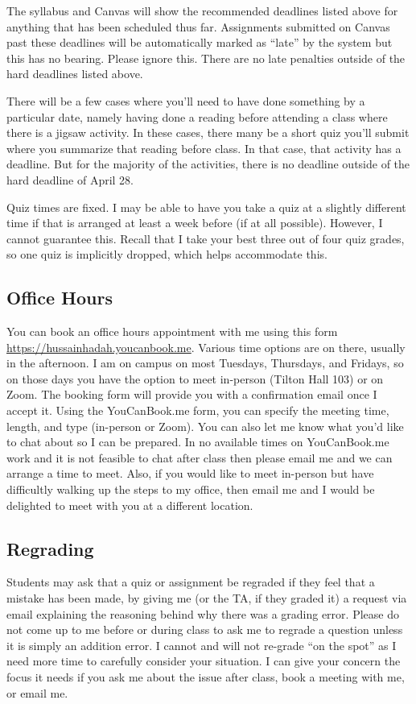\documentclass[11pt,letterpaper,final]{article}
\begin{document}
The syllabus and Canvas will show the recommended deadlines listed above for anything that has been scheduled thus far. Assignments submitted on Canvas past these deadlines will be automatically marked as ``late'' by the system but this has no bearing. Please ignore this. There are no late penalties outside of the hard deadlines listed above.

There will be a few cases where you'll need to have done something by a particular date, namely having done a reading before attending a class where there is a jigsaw activity. In these cases, there many be a short quiz you'll submit where you summarize that reading before class. In that case, that activity has a deadline. But for the majority of the activities, there is no deadline outside of the hard deadline of April 28.

Quiz times are fixed. I may be able to have you take a quiz at a slightly different time if that is arranged at least a week before (if at all possible). However, I cannot guarantee this. Recall that I take your best three out of four quiz grades, so one quiz is implicitly dropped, which helps accommodate this. 

\subsection{Office Hours}
You can book an office hours appointment with me using this form \url{https://hussainhadah.youcanbook.me}. Various time options are on there, usually in the afternoon. I am on campus on most Tuesdays, Thursdays, and Fridays, so on those days you have the option to meet in-person (Tilton Hall 103) or on Zoom.  The booking form will provide you with a confirmation email once I accept it. Using the YouCanBook.me form, you can specify the meeting time, length, and type (in-person or Zoom). You can also let me know what you'd like to chat about so I can be prepared. In no available times on YouCanBook.me work and it is not feasible to chat after class then please email me and we can arrange a time to meet. Also, if you would like to meet in-person but have difficultly walking up the steps to my office, then email me and I would be delighted to meet with you at a different location.
 
\subsection{Regrading}
Students may ask that a quiz or assignment be regraded if they feel that a mistake has been made, by giving me (or the TA, if they graded it) a request via email explaining the reasoning behind why there was a grading error. Please do not come up to me before or during class to ask me to regrade a question unless it is simply an addition error. I cannot and will not re-grade ``on the spot'' as I need more time to carefully consider your situation. I can give your concern the focus it needs if you ask me about the issue after class, book a meeting with me, or email me.
\end{document}
